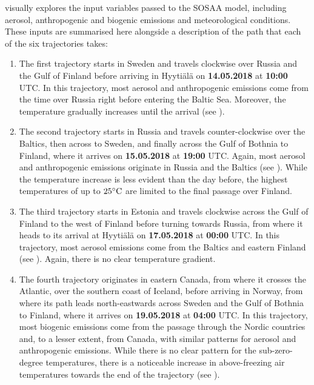\newpar {} visually explores the input variables passed to the SOSAA model, including aerosol, anthropogenic and biogenic emissions and meteorological conditions. These inputs are summarised here alongside a description of the path that each of the six trajectories takes:
\begin{enumerate}
    \item The first trajectory starts in Sweden and travels clockwise over Russia and the Gulf of Finland before arriving in Hyyti\"al\"a on \textbf{14.05.2018} at \textbf{10:00} UTC. In this trajectory, most aerosol and anthropogenic emissions come from the time over Russia right before entering the Baltic Sea. Moreover, the temperature gradually increases until the arrival (see ).
    \item The second trajectory starts in Russia and travels counter-clockwise over the Baltics, then across to Sweden, and finally across the Gulf of Bothnia to Finland, where it arrives on \textbf{15.05.2018} at \textbf{19:00} UTC. Again, most aerosol and anthropogenic emissions originate in Russia and the Baltics (see ). While the temperature increase is less evident than the day before, the highest temperatures of up to $25 \degree \text{C}$ are limited to the final passage over Finland.
    \item The third trajectory starts in Estonia and travels clockwise across the Gulf of Finland to the west of Finland before turning towards Russia, from where it heads to its arrival at Hyyti\"al\"a on \textbf{17.05.2018} at \textbf{00:00} UTC. In this trajectory, most aerosol emissions come from the Baltics and eastern Finland (see ). Again, there is no clear temperature gradient.
    \item The fourth trajectory originates in eastern Canada, from where it crosses the Atlantic, over the southern coast of Iceland, before arriving in Norway, from where its path leads north-eastwards across Sweden and the Gulf of Bothnia to Finland, where it arrives on \textbf{19.05.2018} at \textbf{04:00} UTC. In this trajectory, most biogenic emissions come from the passage through the Nordic countries and, to a lesser extent, from Canada, with similar patterns for aerosol and anthropogenic emissions. While there is no clear pattern for the sub-zero-degree temperatures, there is a noticeable increase in above-freezing air temperatures towards the end of the trajectory (see ).

\end{enumerate}
